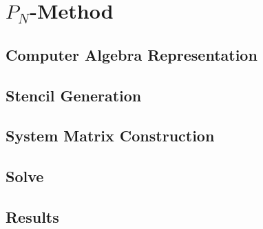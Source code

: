\chapter{$P_N$-Method}
%
\label{sec:pnmethod}

\section{Computer Algebra Representation}




\section{Stencil Generation}
\section{System Matrix Construction}
\section{Solve}
\section{Results}
